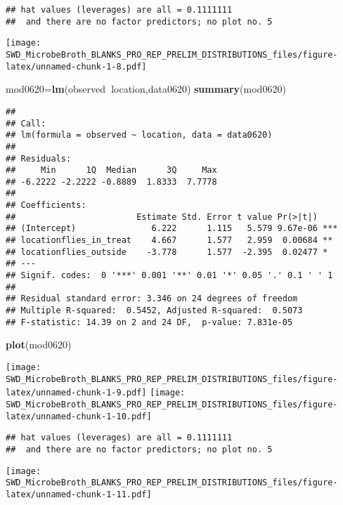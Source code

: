 \documentclass[]{article}
\newenvironment{Shaded}{\begin{snugshade}}{\end{snugshade}}
\newcommand{\KeywordTok}[1]{\textcolor[rgb]{0.13,0.29,0.53}{\textbf{#1}}}
\newcommand{\OperatorTok}[1]{\textcolor[rgb]{0.81,0.36,0.00}{\textbf{#1}}}
\newcommand{\NormalTok}[1]{#1}
\begin{document}
\begin{verbatim}
## hat values (leverages) are all = 0.1111111
##  and there are no factor predictors; no plot no. 5
\end{verbatim}

\texttt{[image: SWD\_MicrobeBroth\_BLANKS\_PRO\_REP\_PRELIM\_DISTRIBUTIONS\_files/figure-latex/unnamed-chunk-1-8.pdf]}

\begin{Shaded}
\begin{Highlighting}[]
\NormalTok{mod0620=}\KeywordTok{lm}\NormalTok{(observed}\OperatorTok{~}\NormalTok{location,data0620)}
\KeywordTok{summary}\NormalTok{(mod0620)}
\end{Highlighting}
\end{Shaded}

\begin{verbatim}
## 
## Call:
## lm(formula = observed ~ location, data = data0620)
## 
## Residuals:
##     Min      1Q  Median      3Q     Max 
## -6.2222 -2.2222 -0.8889  1.8333  7.7778 
## 
## Coefficients:
##                        Estimate Std. Error t value Pr(>|t|)    
## (Intercept)               6.222      1.115   5.579 9.67e-06 ***
## locationflies_in_treat    4.667      1.577   2.959  0.00684 ** 
## locationflies_outside    -3.778      1.577  -2.395  0.02477 *  
## ---
## Signif. codes:  0 '***' 0.001 '**' 0.01 '*' 0.05 '.' 0.1 ' ' 1
## 
## Residual standard error: 3.346 on 24 degrees of freedom
## Multiple R-squared:  0.5452, Adjusted R-squared:  0.5073 
## F-statistic: 14.39 on 2 and 24 DF,  p-value: 7.831e-05
\end{verbatim}

\begin{Shaded}
\begin{Highlighting}[]
\KeywordTok{plot}\NormalTok{(mod0620)}
\end{Highlighting}
\end{Shaded}

\texttt{[image: SWD\_MicrobeBroth\_BLANKS\_PRO\_REP\_PRELIM\_DISTRIBUTIONS\_files/figure-latex/unnamed-chunk-1-9.pdf]}
\texttt{[image: SWD\_MicrobeBroth\_BLANKS\_PRO\_REP\_PRELIM\_DISTRIBUTIONS\_files/figure-latex/unnamed-chunk-1-10.pdf]}

\begin{verbatim}
## hat values (leverages) are all = 0.1111111
##  and there are no factor predictors; no plot no. 5
\end{verbatim}

\texttt{[image: SWD\_MicrobeBroth\_BLANKS\_PRO\_REP\_PRELIM\_DISTRIBUTIONS\_files/figure-latex/unnamed-chunk-1-11.pdf]}
\end{document}
